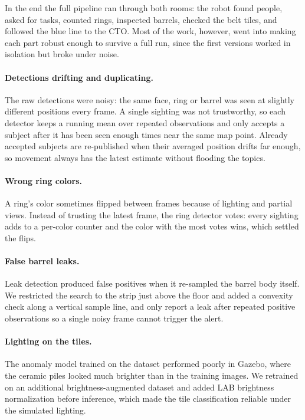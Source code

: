 \documentclass[a4paper, 11pt]{article}
\begin{document}
In the end the full pipeline ran through both rooms: the robot found people, asked for
tasks, counted rings, inspected barrels, checked the belt tiles, and followed the blue
line to the CTO. Most of the work, however, went into making each part robust enough to
survive a full run, since the first versions worked in isolation but broke under noise.

\paragraph{Detections drifting and duplicating.}
The raw detections were noisy: the same face, ring or barrel was seen at slightly
different positions every frame. A single sighting was not trustworthy, so each detector
keeps a running mean over repeated observations and only accepts a subject after it has
been seen enough times near the same map point. Already accepted subjects are
re-published when their averaged position drifts far enough, so movement always has the
latest estimate without flooding the topics.

\paragraph{Wrong ring colors.}
A ring's color sometimes flipped between frames because of lighting and partial views.
Instead of trusting the latest frame, the ring detector votes: every sighting adds to a
per-color counter and the color with the most votes wins, which settled the flips.

\paragraph{False barrel leaks.}
Leak detection produced false positives when it re-sampled the barrel body itself. We
restricted the search to the strip just above the floor and added a convexity check along
a vertical sample line, and only report a leak after repeated positive observations so a
single noisy frame cannot trigger the alert.

\paragraph{Lighting on the tiles.}
The anomaly model trained on the dataset performed poorly in Gazebo, where the ceramic
piles looked much brighter than in the training images. We retrained on an additional
brightness-augmented dataset and added LAB brightness normalization before inference,
which made the tile classification reliable under the simulated lighting.
\end{document}
